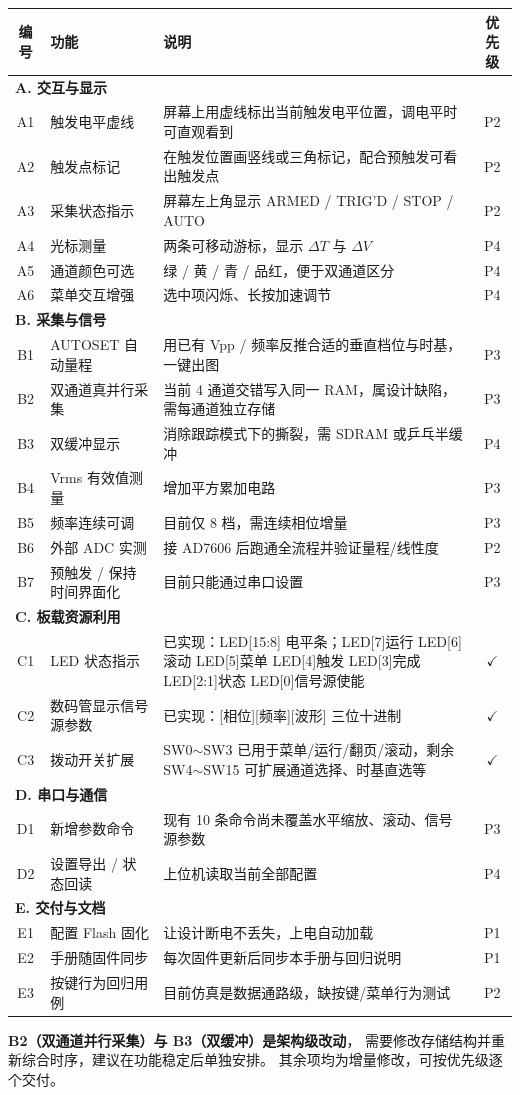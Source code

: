 \documentclass[UTF8,a4paper,11pt]{ctexart}
\begin{document}
\begin{center}
\small
\begin{tabular}{clp{7.0cm}c}
\toprule
编号 & 功能 & 说明 & 优先级\\
\midrule
\multicolumn{4}{l}{\textbf{A. 交互与显示}}\\
\midrule
A1 & 触发电平虚线 & 屏幕上用虚线标出当前触发电平位置，调电平时可直观看到 & P2\\
A2 & 触发点标记 & 在触发位置画竖线或三角标记，配合预触发可看出触发点 & P2\\
A3 & 采集状态指示 & 屏幕左上角显示 ARMED / TRIG'D / STOP / AUTO & P2\\
A4 & 光标测量 & 两条可移动游标，显示 $\Delta T$ 与 $\Delta V$ & P4\\
A5 & 通道颜色可选 & 绿 / 黄 / 青 / 品红，便于双通道区分 & P4\\
A6 & 菜单交互增强 & 选中项闪烁、长按加速调节 & P4\\
\midrule
\multicolumn{4}{l}{\textbf{B. 采集与信号}}\\
\midrule
B1 & AUTOSET 自动量程 & 用已有 Vpp / 频率反推合适的垂直档位与时基，一键出图 & P3\\
B2 & 双通道真并行采集 & 当前 4 通道交错写入同一 RAM，属设计缺陷，需每通道独立存储 & P3\\
B3 & 双缓冲显示 & 消除跟踪模式下的撕裂，需 SDRAM 或乒乓半缓冲 & P4\\
B4 & Vrms 有效值测量 & 增加平方累加电路 & P3\\
B5 & 频率连续可调 & 目前仅 8 档，需连续相位增量 & P3\\
B6 & 外部 ADC 实测 & 接 AD7606 后跑通全流程并验证量程/线性度 & P2\\
B7 & 预触发 / 保持时间界面化 & 目前只能通过串口设置 & P3\\
\midrule
\multicolumn{4}{l}{\textbf{C. 板载资源利用}}\\
\midrule
C1 & LED 状态指示 & 已实现：LED[15:8] 电平条；LED[7]运行 LED[6]滚动 LED[5]菜单 LED[4]触发 LED[3]完成 LED[2:1]状态 LED[0]信号源使能 & $\checkmark$\\
C2 & 数码管显示信号源参数 & 已实现：[相位][频率][波形] 三位十进制 & $\checkmark$\\
C3 & 拨动开关扩展 & SW0$\sim$SW3 已用于菜单/运行/翻页/滚动，剩余 SW4$\sim$SW15 可扩展通道选择、时基直选等 & $\checkmark$\\
\midrule
\multicolumn{4}{l}{\textbf{D. 串口与通信}}\\
\midrule
D1 & 新增参数命令 & 现有 10 条命令尚未覆盖水平缩放、滚动、信号源参数 & P3\\
D2 & 设置导出 / 状态回读 & 上位机读取当前全部配置 & P4\\
\midrule
\multicolumn{4}{l}{\textbf{E. 交付与文档}}\\
\midrule
E1 & 配置 Flash 固化 & 让设计断电不丢失，上电自动加载 & P1\\
E2 & 手册随固件同步 & 每次固件更新后同步本手册与回归说明 & P1\\
E3 & 按键行为回归用例 & 目前仿真是数据通路级，缺按键/菜单行为测试 & P2\\
\bottomrule
\end{tabular}
\end{center}

\begin{tipbox}
\textbf{B2（双通道并行采集）与 B3（双缓冲）是架构级改动}，
需要修改存储结构并重新综合时序，建议在功能稳定后单独安排。
其余项均为增量修改，可按优先级逐个交付。
\end{tipbox}
\end{document}
